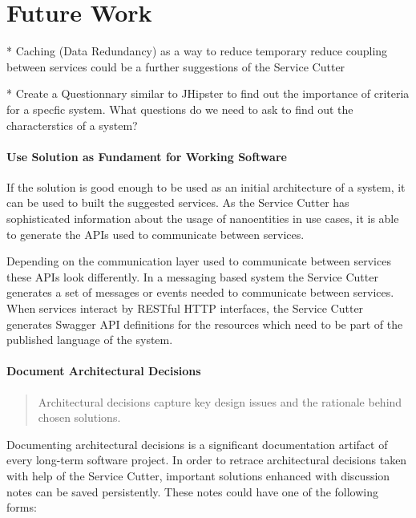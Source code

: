 \chapter{Future Work}

* Caching (Data Redundancy) as a way to reduce temporary reduce coupling between services could be a further suggestions of the Service Cutter

* Create a Questionnary similar to JHipster to find out the importance of criteria for a specfic system. What questions do we need to ask to find out the characterstics of a system? 

\subsubsection{Use Solution as Fundament for Working Software}

If the solution is good enough to be used as an initial architecture of a system, it can be used to built the suggested services. As the Service Cutter has sophisticated information about the usage of nanoentities in use cases, it is able to generate the APIs used to communicate between services. 

Depending on the communication layer used to communicate between services these APIs look differently. In a messaging based system the Service Cutter generates a set of messages or events needed to communicate between services. When services interact by RESTful HTTP interfaces, the Service Cutter generates Swagger\cite{swagger} API definitions for the resources which need to be part of the published language\cite[p.375]{evans2003domain} of the system. 


\subsubsection{Document Architectural Decisions}

\begin{quote}
	Architectural decisions capture key design issues and the rationale behind chosen solutions.\cite{zioAD}
\end{quote}

Documenting architectural decisions is a significant documentation artifact of every long-term software project. In order to retrace architectural decisions taken with help of the Service Cutter, important solutions enhanced with discussion notes can be saved persistently. These notes could have one of the following forms:

